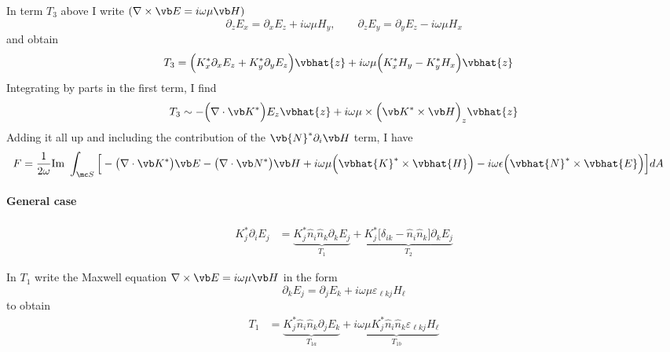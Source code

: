 In term $T_3$ above I write $(\nabla \times \vb E = i\omega \mu \vb H)$
$$ \partial_z E_x = \partial_x E_z + i\omega\mu H_y, \qquad
   \partial_z E_y = \partial_y E_z - i\omega\mu H_x
$$
and obtain
\begin{align*}
 T_3 &= 
  \Big(K_x^* \partial_x E_z + K_y^* \partial_y E_z \Big)\vbhat{z}
 +i\omega \mu \Big( K_x^* H_y - K_y^* H_x\Big)\vbhat{z}
\end{align*}
Integrating by parts in the first term, I find
$$ T_3 \sim
   -\Big(\nabla \cdot \vb K^*\Big) E_z \vbhat{z}
   +i\omega \mu \times \Big(\vb K^* \times \vb H\Big)_z \vbhat{z}
$$
Adding it all up and including the contribution of the 
$\vb{N}^* \partial_i \vb H$ term, I have 
\begin{align*}
 F&=\frac{1}{2\omega}\text{Im }\int_{\mc S}
   \Big[ -\big(\nabla \cdot \vb K^*\big) \vb E
         -\big(\nabla \cdot \vb N^*\big) \vb H
        +i\omega \mu \Big(\vbhat{K}^* \times \vbhat{H}\Big)
        -i\omega \epsilon \Big(\vbhat{N}^* \times \vbhat{E}\Big)
   \Big]dA
\end{align*}
 
\paragraph{General case}
\begin{align*}
 K^*_j \partial_i E_j
&= \underbrace{K^*_j \hat{n}_i \hat{n}_k \partial_k E_j}_{T_1}
  +\underbrace{K^*_j \Big[\delta_{ik}-\hat{n}_i \hat{n}_k\Big] \partial_k E_j}_{T_2}
\end{align*}

In $T_1$ write the Maxwell equation
$\nabla \times \vb E = i\omega \mu \vb H$
in the form
$$ \partial_k E_j = \partial_j E_k + i\omega \mu \varepsilon_{\ell kj} H_\ell $$
to obtain
\begin{align*}
 T_1 &= \underbrace{K^*_j \hat{n}_i \hat{n}_k \partial_j E_k}_{T_{1a}}
       +\underbrace{i\omega \mu K^*_j \hat{n}_i \hat{n}_k \varepsilon_{\ell kj} H_\ell}_{T_{1b}}
\end{align*}

